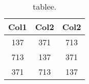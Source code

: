 \begin{table}[htbp]
\centering
\begin{tabular}{||c c c ||} 
 \hline
 Col1 & Col2 & Col2 \\ [1ex] 
 \hline\hline
 137 & 371 & 713   \\
 \hline
 713 & 137 & 371  \\
 \hline
 371 & 713 & 137  \\
 \hline
\end{tabular}
\label{tab:random_numbers}
\caption{tablee.}
\end{table}